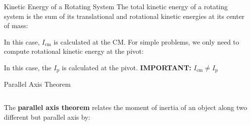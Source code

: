 \documentclass[12pt,compress,aspectratio=169]{beamer}
\begin{document}
\begin{frame}{Kinetic Energy of a Rotating System}
  The total kinetic energy of a rotating system is the sum of its translational
  and rotational kinetic energies at its center of mass:

  
  In this case, $I_\text{cm}$ is calculated at the CM. For simple problems, we
  only need to compute rotational kinetic energy at the pivot:

  
  In this case, the $I_\text{p}$ is calculated at the pivot.
  \textbf{IMPORTANT:} $I_\text{cm}\neq I_\text{p}$
\end{frame}



\begin{frame}{Parallel Axis Theorem}
  \begin{columns}
    
    The \textbf{parallel axis theorem} relates the moment of inertia of an
    object along two different but parallel axis by:

  \end{columns}
\end{frame}
\end{document}
